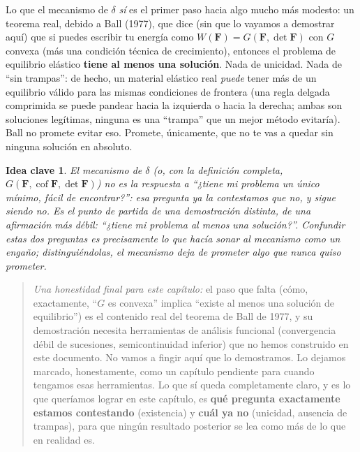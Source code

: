 \documentclass[11pt,a4paper]{article}
\newtheorem{takeaway}{Idea clave}
\newcommand{\Cof}{\operatorname{cof}}
\begin{document}
Lo que el mecanismo de $\delta$ \emph{s\'i} es el primer paso hacia
algo mucho m\'as modesto: un teorema real, debido a Ball (1977), que
dice (sin que lo vayamos a demostrar aqu\'i) que si puedes escribir tu
energ\'ia como $W(\bm F)=G(\bm F,\det\bm F)$ con $G$ convexa (m\'as una
condici\'on t\'ecnica de crecimiento), entonces el problema de
equilibrio el\'astico \textbf{tiene al menos una soluci\'on}. Nada de
unicidad. Nada de ``sin trampas'': de hecho, un material el\'astico
real \emph{puede} tener m\'as de un equilibrio v\'alido para las mismas
condiciones de frontera (una regla delgada comprimida se puede pandear
hacia la izquierda o hacia la derecha; ambas son soluciones leg\'itimas,
ninguna es una ``trampa'' que un mejor m\'etodo evitar\'ia). Ball no
promete evitar eso. Promete, \'unicamente, que no te vas a quedar sin
ninguna soluci\'on en absoluto.

\begin{takeaway}
El mecanismo de $\delta$ (o, con la definici\'on completa,
$G(\bm F,\Cof\bm F,\det\bm F)$) no es la respuesta a ``¿tiene mi
problema un \'unico m\'inimo, f\'acil de encontrar?'': esa pregunta ya
la contestamos que no, y sigue siendo no. Es el punto de partida de una
demostraci\'on \emph{distinta}, de una afirmaci\'on \emph{m\'as d\'ebil}:
``¿tiene mi problema \emph{al menos una} soluci\'on?''. Confundir estas
dos preguntas es precisamente lo que hac\'ia sonar al mecanismo como un
enga\~no; distingui\'endolas, el mecanismo deja de prometer algo que
nunca quiso prometer.
\end{takeaway}

\begin{quote}
\emph{Una honestidad final para este cap\'itulo:} el paso que falta
(c\'omo, exactamente, ``$G$ es convexa'' implica ``existe al menos una
soluci\'on de equilibrio'') es el contenido real del teorema de Ball
de 1977, y su demostraci\'on necesita herramientas de an\'alisis
funcional (convergencia d\'ebil de sucesiones, semicontinuidad
inferior) que no hemos construido en este documento. No vamos a
fingir aqu\'i que lo demostramos. Lo dejamos marcado, honestamente,
como un cap\'itulo pendiente para cuando tengamos esas herramientas.
Lo que s\'i queda completamente claro, y es lo que quer\'iamos lograr
en este cap\'itulo, es \textbf{qu\'e pregunta exactamente estamos
contestando} (existencia) y \textbf{cu\'al ya no} (unicidad, ausencia
de trampas), para que ning\'un resultado posterior se lea como m\'as
de lo que en realidad es.
\end{quote}
\end{document}
